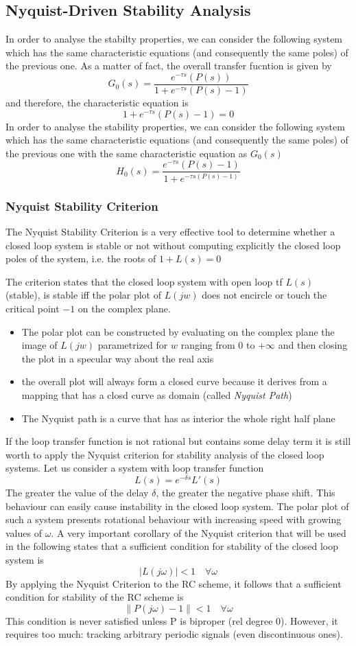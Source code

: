 \documentclass{book}
\begin{document}
\subsection{Nyquist-Driven Stability Analysis}
In order to analyse the stabilty properties, we can consider the following system which has the same characteristic equations (and consequently the same poles) of the previous one. As a matter of fact, the overall transfer fucntion is given by 
\[
    G_0(s) = \displaystyle\frac{e^{-\tau s}(P(s)) }{1+e^{-\tau s}(P(s)-1)}
\]
and therefore, the characteristic equation is 
\[
    1+e^{-\tau s}(P(s)-1)=0
\]
In order to analyse the stability properties, we can consider the following system which has the same characteristic equations (and consequently the same poles) of the previous one
with the same characteristic equation as $G_0(s)$ 
\[
    H_0(s) = \displaystyle\frac{e^{-\tau s}(P(s)-1) }{1+e^{-\tau s(P(s)-1)}}
\]
\subsubsection{Nyquist Stability Criterion} 
The Nyquist Stability Criterion is a very effective tool to determine whether a closed loop system is stable or not without computing explicitly the closed loop poles of the system, i.e. the roots of $1+L(s)=0$

The criterion states that the closed loop system with open loop tf $L(s)$ (stable), is stable iff the polar plot of $L(jw)$ does not encircle or touch the critical point $-1$ on the complex plane. 
\begin{itemize}
    \item The polar plot can be constructed by evaluating on the complex plane the image of $L(jw)$ parametrized for $w$ ranging from 0 to $+\infty$ and then closing the plot in a specular way about the real axis 
    \item the overall plot will always form a closed curve because it derives from a mapping that has a closd curve as domain (called \emph{Nyquist Path}) 
    \item The Nyquist path is a curve that has as interior the whole right half plane 
\end{itemize}
If the loop transfer function is not rational but contains some delay term it is still worth to apply the Nyquist criterion for stability analysis of the closed loop systems. Let us consider a system with loop transfer function 
\[
    L(s) = e^{-\delta s} L'(s)
\]
The greater the value of the delay $\delta$, the greater the negative phase shift. This behaviour can easily cause instability in the closed loop system. The polar plot of such a system presents rotational behaviour with increasing speed with growing values of $\omega$. A very important corollary of the Nyquist criterion that will be used in the following states that a sufficient condition for stability of the closed loop system is 
\[
    |L(j\omega)|<1 \quad \forall \omega
\]
By applying the Nyquist Criterion to the RC scheme, it follows that a sufficient condition for stability of the RC scheme is 
\[
    \|P(j\omega)-1\| < 1 \quad \forall \omega
\]
This condition is never satisfied unless P is biproper (rel degree 0). However, it requires too much: tracking arbitrary periodic signals (even discontinuous ones).
\end{document}
